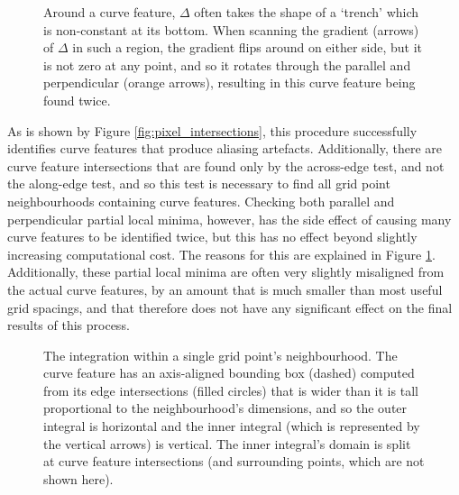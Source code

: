 \begin{figure}[h!]
\centering

\caption{\label{fig:trench_duplication} Around a curve feature, $\Delta$ often takes the shape of a `trench' which is non-constant at its bottom. When scanning the gradient (arrows) of $\Delta$ in such a region, the gradient flips around on either side, but it is not zero at any point, and so it rotates through the parallel and perpendicular (orange arrows), resulting in this curve feature being found twice.}
\end{figure}

As is shown by Figure \ref{fig:pixel_intersections}, this procedure successfully identifies curve features that produce aliasing artefacts. Additionally, there are curve feature intersections that are found only by the across-edge test, and not the along-edge test, and so this test is necessary to find all grid point neighbourhoods containing curve features. Checking both parallel and perpendicular partial local minima, however, has the side effect of causing many curve features to be identified twice, but this has no effect beyond slightly increasing computational cost. The reasons for this are explained in Figure \ref{fig:trench_duplication}. Additionally, these partial local minima are often very slightly misaligned from the actual curve features, by an amount that is much smaller than most useful grid spacings, and that therefore does not have any significant effect on the final results of this process.

\begin{figure}[h!]
\centering
{}
\caption{\label{fig:neighbourhood_integration} The integration within a single grid point's neighbourhood. The curve feature has an axis-aligned bounding box (dashed) computed from its edge intersections (filled circles) that is wider than it is tall proportional to the neighbourhood's dimensions, and so the outer integral is horizontal and the inner integral (which is represented by the vertical arrows) is vertical. The inner integral's domain is split at curve feature intersections (and surrounding points, which are not shown here).}
\end{figure}


